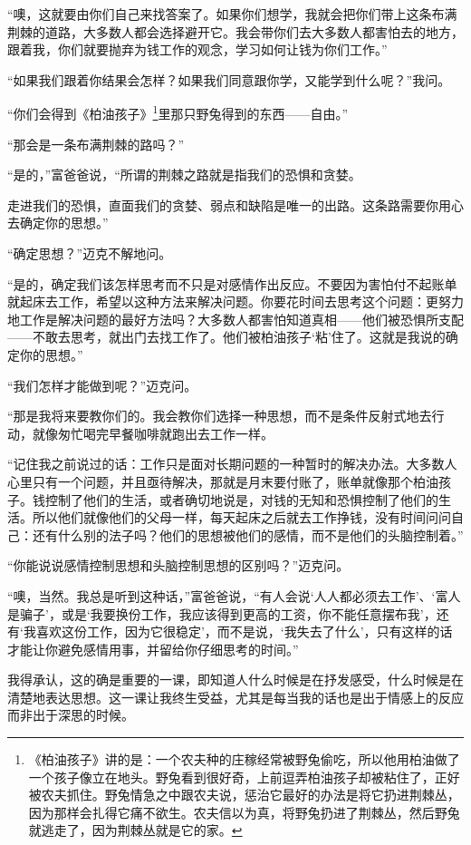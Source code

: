 “噢，这就要由你们自己来找答案了。如果你们想学，我就会把你们带上这条布满荆棘的道路，大多数人都会选择避开它。我会带你们去大多数人都害怕去的地方，跟着我，你们就要抛弃为钱工作的观念，学习如何让钱为你们工作。”

“如果我们跟着你结果会怎样？如果我们同意跟你学，又能学到什么呢？”我问。


“你们会得到《柏油孩子》\footnote{《柏油孩子》讲的是：一个农夫种的庄稼经常被野兔偷吃，所以他用柏油做了一个孩子像立在地头。野兔看到很好奇，上前逗弄柏油孩子却被粘住了，正好被农夫抓住。野兔情急之中跟农夫说，惩治它最好的办法是将它扔进荆棘丛，因为那样会扎得它痛不欲生。农夫信以为真，将野兔扔进了荆棘丛，然后野兔就逃走了，因为荆棘丛就是它的家。}里那只野兔得到的东西——自由。”

“那会是一条布满荆棘的路吗？”

“是的，”富爸爸说，“所谓的荆棘之路就是指我们的恐惧和贪婪。

走进我们的恐惧，直面我们的贪婪、弱点和缺陷是唯一的出路。这条路需要你用心去确定你的思想。”

“确定思想？”迈克不解地问。

“是的，确定我们该怎样思考而不只是对感情作出反应。不要因为害怕付不起账单就起床去工作，希望以这种方法来解决问题。你要花时间去思考这个问题：更努力地工作是解决问题的最好方法吗？大多数人都害怕知道真相——他们被恐惧所支配——不敢去思考，就出门去找工作了。他们被柏油孩子‘粘’住了。这就是我说的确定你的思想。”

“我们怎样才能做到呢？”迈克问。

“那是我将来要教你们的。我会教你们选择一种思想，而不是条件反射式地去行动，就像匆忙喝完早餐咖啡就跑出去工作一样。

“记住我之前说过的话：工作只是面对长期问题的一种暂时的解决办法。大多数人心里只有一个问题，并且亟待解决，那就是月末要付账了，账单就像那个柏油孩子。钱控制了他们的生活，或者确切地说是，对钱的无知和恐惧控制了他们的生活。所以他们就像他们的父母一样，每天起床之后就去工作挣钱，没有时间问问自己：还有什么别的法子吗？他们的思想被他们的感情，而不是他们的头脑控制着。”

“你能说说感情控制思想和头脑控制思想的区别吗？”迈克问。

“噢，当然。我总是听到这种话，”富爸爸说，“有人会说‘人人都必须去工作’、‘富人是骗子’，或是‘我要换份工作，我应该得到更高的工资，你不能任意摆布我’，还有‘我喜欢这份工作，因为它很稳定’，而不是说，‘我失去了什么’，只有这样的话才能让你避免感情用事，并留给你仔细思考的时间。”

我得承认，这的确是重要的一课，即知道人什么时候是在抒发感受，什么时候是在清楚地表达思想。这一课让我终生受益，尤其是每当我的话也是出于情感上的反应而非出于深思的时候。

